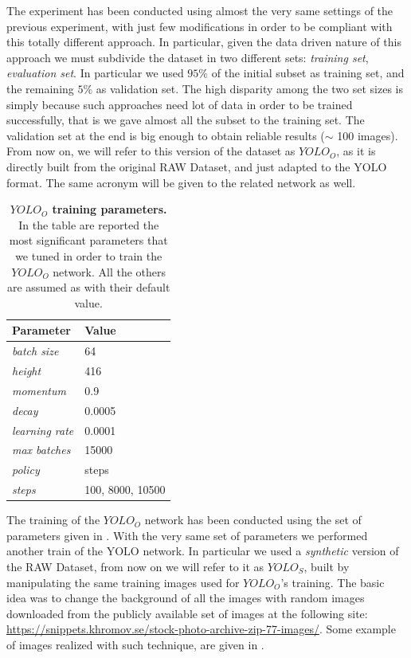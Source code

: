 The experiment has been conducted using almost the very same settings of the previous experiment, with just few modifications in order to be compliant with this totally different approach. In particular, given the data driven nature of this approach we must subdivide the dataset in two different sets: \emph{training set}, \emph{evaluation set}. In particular we used $95\%$ of the initial subset as training set, and the remaining $5\%$ as validation set. The high disparity among the two set sizes is simply because such approaches need lot of data in order to be trained successfully, that is we gave almost all the subset to the training set. The validation set at the end is big enough to obtain reliable results ($\sim$ 100 images). From now on, we will refer to this version of the dataset as \emph{$YOLO_O$}, as it is directly built from the original RAW Dataset, and just adapted to the YOLO format. The same acronym will be given to the related network as well.

\begin{table}
	\centering
    \begin{tabular}{| l | l |}
    \hline
    \textbf{Parameter} & \textbf{Value} \\ \hline
    \emph{batch size} & 64 \\
	\emph{height} & 416 \\
	\emph{momentum} & 0.9 \\
	\emph{decay} & 0.0005 \\
	\emph{learning rate} & 0.0001 \\
	\emph{max batches} & 15000 \\
	\emph{policy} & steps \\
	\emph{steps} & 100, 8000, 10500 \\
    \hline
    \end{tabular}
    \caption{\textbf{$YOLO_O$ training parameters.} In the table are reported the most significant parameters that we tuned in order to train the $YOLO_O$ network. All the others are assumed as with their default value.}
    \label{tab:YOLO_standard_training_params}
\end{table}

The training of the $YOLO_O$ network has been conducted using the set of parameters given in . With the very same set of parameters we performed another train of the YOLO network. In particular we used a \emph{synthetic} version of the RAW Dataset, from now on we will refer to it as $YOLO_S$, built by manipulating the same training images used for $YOLO_O$'s training. The basic idea was to change the background of all the images with random images downloaded from the publicly available set of images at the following site: \url{https://snippets.khromov.se/stock-photo-archive-zip-77-images/}. Some example of images realized with such technique, are given in .

